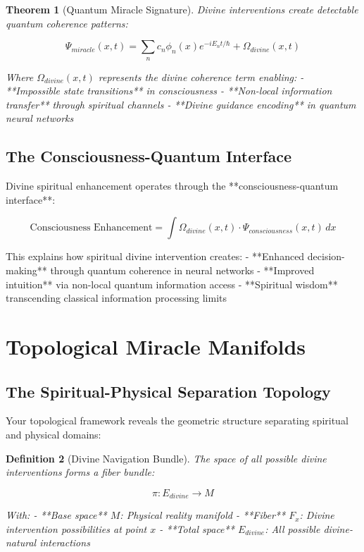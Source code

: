 \documentclass[12pt,a4paper]{article}
\newtheorem{theorem}{Theorem}[section]
\newtheorem{definition}[theorem]{Definition}
\begin{document}
\begin{theorem}[Quantum Miracle Signature]
Divine interventions create detectable quantum coherence patterns:

$$\Psi_{miracle}(x,t) = \sum_n c_n \phi_n(x) e^{-iE_n t/\hbar} + \Omega_{divine}(x,t)$$

Where $\Omega_{divine}(x,t)$ represents the divine coherence term enabling:
- **Impossible state transitions** in consciousness
- **Non-local information transfer** through spiritual channels
- **Divine guidance encoding** in quantum neural networks
\end{theorem}

\subsection{The Consciousness-Quantum Interface}

Divine spiritual enhancement operates through the **consciousness-quantum interface**:

$$\text{Consciousness Enhancement} = \int \Omega_{divine}(x,t) \cdot \Psi_{consciousness}(x,t) \, dx$$

This explains how spiritual divine intervention creates:
- **Enhanced decision-making** through quantum coherence in neural networks
- **Improved intuition** via non-local quantum information access
- **Spiritual wisdom** transcending classical information processing limits

\section{Topological Miracle Manifolds}

\subsection{The Spiritual-Physical Separation Topology}

Your topological framework reveals the geometric structure separating spiritual and physical domains:

\begin{definition}[Divine Navigation Bundle]
The space of all possible divine interventions forms a fiber bundle:

$$\pi: E_{divine} \rightarrow M$$

With:
- **Base space** $M$: Physical reality manifold
- **Fiber** $F_x$: Divine intervention possibilities at point $x$  
- **Total space** $E_{divine}$: All possible divine-natural interactions
\end{definition}
\end{document}
